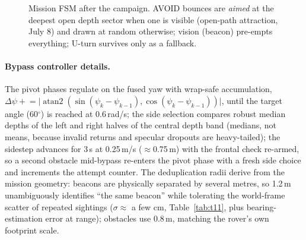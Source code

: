 \begin{figure}[htbp]
\centering
{}
\caption{Mission FSM after the campaign. AVOID bounces are \emph{aimed} at
the deepest open depth sector when one is visible (open-path attraction,
July 8) and drawn at random otherwise; vision (beacon) pre-empts everything;
U-turn survives only as a fallback.}
\label{fig:fsm}
\end{figure}

\paragraph{Bypass controller details.} The pivot phases regulate on the fused
yaw with wrap-safe accumulation,
$\Delta\psi \mathrel{+}= \big|\operatorname{atan2}(\sin(\psi_k - \psi_{k-1}),
\cos(\psi_k - \psi_{k-1}))\big|$, until the target angle (60$^\circ$) is
reached at 0.6\,rad/s; the side selection compares robust median depths of
the left and right halves of the central depth band (medians, not means,
because invalid returns and specular dropouts are heavy-tailed); the sidestep
advances for 3\,s at 0.25\,m/s ($\approx$0.75\,m) with the frontal check
re-armed, so a second obstacle mid-bypass re-enters the pivot phase with a
fresh side choice and increments the attempt counter. The deduplication radii
derive from the mission geometry: beacons are physically separated by several
metres, so 1.2\,m unambiguously identifies ``the same beacon'' while
tolerating the world-frame scatter of repeated sightings ($\sigma \approx$
a few cm, Table~\ref{tab:t11}, plus bearing-estimation error at range);
obstacles use 0.8\,m, matching the rover's own footprint scale.

